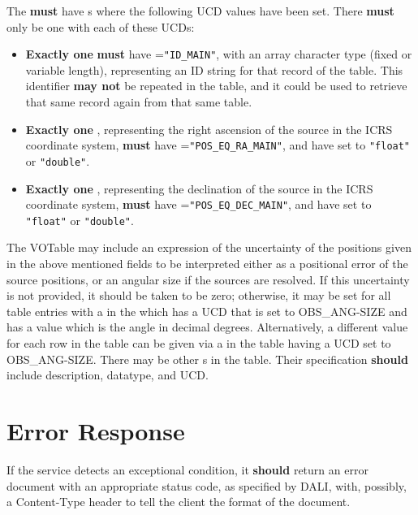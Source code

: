 \documentclass[11pt,a4paper]{ivoa}
\begin{document}
The  \textbf{must} have s where the following UCD values have been set. There \textbf{must} only be one  with each of these UCDs:
\begin{itemize}
	\item \textbf{Exactly one}  \textbf{must} have =\texttt{"ID\_MAIN"}, with an array character type (fixed or variable length), representing an ID string for that record of the table. This identifier \textbf{may not} be repeated in the table, and it could be used to retrieve that same record again from that same table.
	\item \textbf{Exactly one} , representing the right ascension of the source in the ICRS coordinate system, \textbf{must} have =\texttt{"POS\_EQ\_RA\_MAIN"}, and have  set to \texttt{"float"} or \texttt{"double"}.
	\item \textbf{Exactly one} , representing the declination of the source in the ICRS coordinate system, \textbf{must} have =\texttt{"POS\_EQ\_DEC\_MAIN"}, and have  set to \texttt{"float"} or \texttt{"double"}.
\end{itemize}

The VOTable may include an expression of the uncertainty of the positions given in the above mentioned fields to be interpreted either as a positional error of the source positions, or an angular size if the sources are resolved. If this uncertainty is not provided, it should be taken to be zero; otherwise, it may be set for all table entries with a  in the  which has a UCD that is set to OBS\_ANG-SIZE and has a value which is the angle in decimal degrees. Alternatively, a different value for each row in the table can be given via a  in the table having a UCD set to OBS\_ANG-SIZE.
There may be other s in the table. Their specification \textbf{should} include description, datatype, and UCD.

\section{Error Response}
\label{sec:error}

If the service detects an exceptional condition, it \textbf{should} return an error document with an appropriate status code, as specified by DALI, with, possibly, a Content-Type header to tell the client the format of the document.
\end{document}
